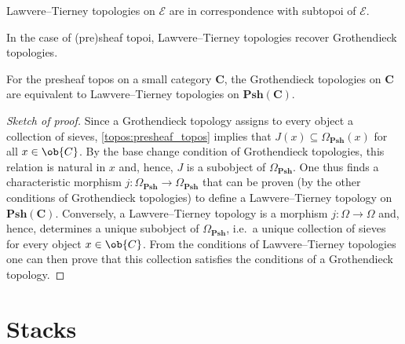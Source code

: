 
    \begin{property}
        Lawvere--Tierney topologies on $\mathcal{E}$ are in correspondence with subtopoi of $\mathcal{E}$.
    \end{property}
    In the case of (pre)sheaf topoi, Lawvere--Tierney topologies recover Grothendieck topologies.
    \begin{result}
        For the presheaf topos on a small category $\mathbf{C}$, the Grothendieck topologies on $\mathbf{C}$ are equivalent to Lawvere--Tierney topologies on $\mathbf{Psh(C)}$.
        \begin{mdframed}[roundcorner=10pt, linecolor=blue, linewidth=1pt]
            \begin{proof}[Sketch of proof]
                Since a Grothendieck topology assigns to every object a collection of sieves, \cref{topos:presheaf_topos} implies that $J(x)\subseteq\Omega_\mathbf{Psh}(x)$ for all $x\in\ob{C}$. By the base change condition of Grothendieck topologies, this relation is natural in $x$ and, hence, $J$ is a subobject of $\Omega_\mathbf{Psh}$. One thus finds a characteristic morphism $j:\Omega_\mathbf{Psh}\rightarrow\Omega_\mathbf{Psh}$ that can be proven (by the other conditions of Grothendieck topologies) to define a Lawvere--Tierney topology on $\mathbf{Psh(C)}$. Conversely, a Lawvere--Tierney topology is a morphism $j:\Omega\rightarrow\Omega$ and, hence, determines a unique subobject of $\Omega_\mathbf{Psh}$, i.e.~a unique collection of sieves for every object $x\in\ob{C}$. From the conditions of Lawvere--Tierney topologies one can then prove that this collection satisfies the conditions of a Grothendieck topology.
            \end{proof}
        \end{mdframed}
    \end{result}

\section{Stacks}

